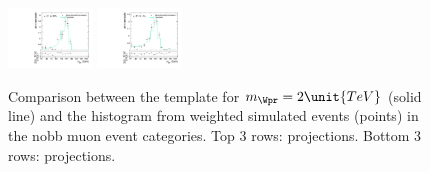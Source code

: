 \begin{figure}[htpb]
  \includegraphics[width=0.2\textwidth]{fig/analysisAppendix/templateVsReco_WprToWH2000_r0_MJ_mu_HP_vbf_HDy.pdf}
  \includegraphics[width=0.2\textwidth]{fig/analysisAppendix/templateVsReco_WprToWH2000_r0_MJ_mu_LP_vbf_HDy.pdf}\\
  \caption{
    Comparison between the \Dy\WprtoWH template for $m_{\Wpr}=2\unit{TeV}$ (solid line) and the histogram from weighted simulated events (points) in the nobb muon event categories.
    Top 3 rows: \MVV projections.
    Bottom 3 rows: \MJ projections.
  }
  \label{fig:1dtemplateVsReco_WprToWH2000}
\end{figure}

